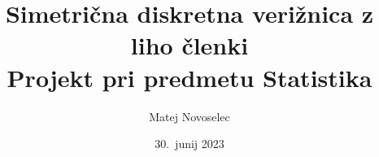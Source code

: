 \documentclass{article}
\begin{document}
\title{Simetrična diskretna verižnica z liho členki\\
    \large Projekt pri predmetu Statistika
}
\author{
    Matej Novoselec\\
}
\date{30.\ junij 2023}

\maketitle

\begin{figure}[H]
    \begin{center}
    \end{center}    
\end{figure}
\end{document}
